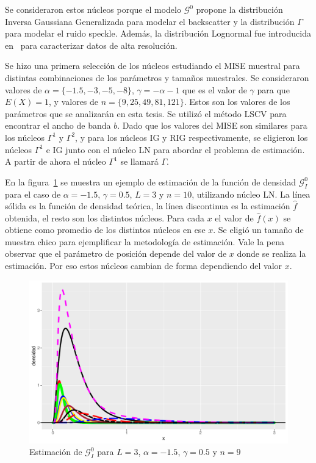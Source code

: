 
Se consideraron estos núcleos porque el modelo $\mathcal{G}^0$ propone la distribución Inversa Gaussiana Generalizada para modelar el backscatter y la distribución $\Gamma$ para modelar el ruido speckle. Además, la distribución Lognormal fue introducida en~\cite{oliverquegan98} para caracterizar datos de alta resolución.


Se hizo una primera selección de los núcleos estudiando el MISE muestral para distintas combinaciones de los parámetros y tamaños muestrales. Se consideraron valores de $\alpha=\{-1.5,-3,-5,-8\}$, $\gamma=-\alpha-1$ que es el valor de $\gamma$ para que $E(X)=1$, y valores de $n=\{9,25,49,81,121\}$. Estos son los valores de los parámetros que se analizarán en esta tesis. Se utilizó el método LSCV para encontrar el ancho de banda $b$. Dado que los valores del MISE son similares para los núcleos $\Gamma^1$ y $\Gamma^2$, y para los núcleos IG y RIG respectivamente, se eligieron los núcleos $\Gamma^1$ e IG junto con el núcleo LN para abordar el problema de estimación. A partir de ahora el núcleo $\Gamma^1$ se llamará $\Gamma$.

En la figura~\ref{EstimacionLN} se muestra un ejemplo de estimación de la función de densidad $\mathcal{G}_I^0$ para el caso de $\alpha=-1.5$, $\gamma=0.5$, $L=3$ y $n=10$, utilizando núcleo LN. La línea sólida es la función de densidad teórica, la línea discontinua es la estimación $\widehat{f}$ obtenida, el resto son los distintos núcleos. Para cada $x$ el valor de $\widehat{f}(x)$ se obtiene como promedio de los distintos núcleos en ese $x$. Se eligió un tamaño de muestra chico para ejemplificar la metodología de estimación. Vale la pena observar que el parámetro de posición depende del valor de $x$ donde se realiza la estimación. Por eso estos núcleos cambian de forma dependiendo del valor $x$.

\begin{figure}[hbt]
	\centering
	\label{EstimacionLN}
	\includegraphics[scale=0.5]{../../Figures/Tesis/Capitulo4/EstimacionDensidadconLN.pdf}
	\caption{Estimación de $\mathcal{G}_I^0$ para $L=3$, $\alpha=-1.5$, $\gamma=0.5$ y $n=9$}
\end{figure}

